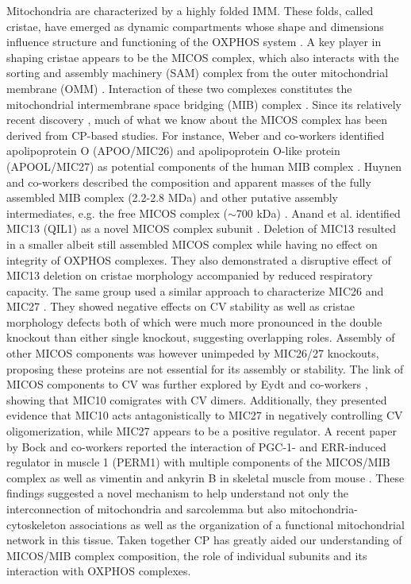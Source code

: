 Mitochondria are characterized by a highly folded IMM. These folds, called cristae, have emerged as dynamic compartments whose shape and dimensions influence structure and functioning of the OXPHOS system \cite{Cogliati_2016}. A key player in shaping cristae appears to be the MICOS complex, which also interacts with the sorting and assembly machinery (SAM) complex from the outer mitochondrial membrane (OMM) \cite{Huynen_2016}. Interaction of these two complexes constitutes the mitochondrial intermembrane space bridging (MIB) complex \cite{Ott_2015}. Since its relatively recent discovery \cite{Harner_2011}, much of what we know about the MICOS complex has been derived from CP-based studies. For instance, Weber and co-workers identified apolipoprotein O (APOO/MIC26) and apolipoprotein O-like protein (APOOL/MIC27) as potential components of the human MIB complex \cite{Weber_2013}. Huynen and co-workers described the composition and apparent masses of the fully assembled MIB complex (2.2-2.8 MDa) and other putative assembly intermediates, e.g. the free MICOS complex ($\sim$700 kDa) \cite{Huynen_2016}. Anand et al. identified MIC13 (QIL1) as a novel MICOS complex subunit \cite{Anand_2016}. Deletion of MIC13 resulted in a smaller albeit still assembled MICOS complex while having no effect on integrity of OXPHOS complexes. They also demonstrated a disruptive effect of MIC13 deletion on cristae morphology accompanied by reduced respiratory capacity. The same group used a similar approach to characterize MIC26 and MIC27 \cite{Anand_2020}. They showed negative effects on CV stability as well as cristae morphology defects both of which were much more pronounced in the double knockout than either single knockout, suggesting overlapping roles. Assembly of other MICOS components was however unimpeded by MIC26/27 knockouts, proposing these proteins are not essential for its assembly or stability. The link of MICOS components to CV was further explored by Eydt and co-workers \cite{Eydt_2017}, showing that MIC10 comigrates with CV dimers. Additionally, they presented evidence that MIC10 acts antagonistically to MIC27 in negatively controlling CV oligomerization, while MIC27 appears to be a positive regulator. A recent paper by Bock and co-workers reported the interaction of  PGC-1- and ERR-induced regulator in muscle 1 (PERM1) with multiple components of the MICOS/MIB complex as well as vimentin and ankyrin B in skeletal muscle from mouse \cite{Bock_2021}. These findings suggested a novel mechanism to help understand not only the interconnection of mitochondria and sarcolemma but also mitochondria-cytoskeleton associations as well as the organization of a functional mitochondrial network in this tissue. Taken together CP has greatly aided our understanding of MICOS/MIB complex composition, the role of individual subunits and its interaction with OXPHOS complexes.

